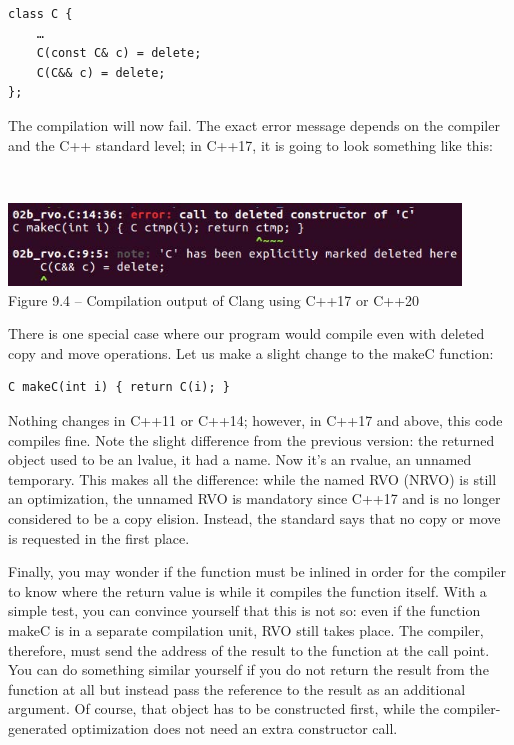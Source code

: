 \begin{lstlisting}[style=styleCXX]
class C {
	…
	C(const C& c) = delete;
	C(C&& c) = delete;
}; 
\end{lstlisting}

The compilation will now fail. The exact error message depends on the compiler and the C++ standard level; in C++17, it is going to look something like this:

\hspace*{\fill} \\ %
\begin{center}
\includegraphics[width=0.9\textwidth]{content/3/chapter9/images/4.jpg}\\
Figure 9.4 – Compilation output of Clang using C++17 or C++20
\end{center}

There is one special case where our program would compile even with deleted copy and move operations. Let us make a slight change to the makeC function:

\begin{lstlisting}[style=styleCXX]
C makeC(int i) { return C(i); }
\end{lstlisting}

Nothing changes in C++11 or C++14; however, in C++17 and above, this code compiles fine. Note the slight difference from the previous version: the returned object used to be an lvalue, it had a name. Now it’s an rvalue, an unnamed temporary. This makes all the difference: while the named RVO (NRVO) is still an optimization, the unnamed RVO is mandatory since C++17 and is no longer considered to be a copy elision. Instead, the standard says that no copy or move is requested in the first place. 

Finally, you may wonder if the function must be inlined in order for the compiler to know where the return value is while it compiles the function itself. With a simple test, you can convince yourself that this is not so: even if the function makeC is in a separate compilation unit, RVO still takes place. The compiler, therefore, must send the address of the result to the function at the call point. You can do something similar yourself if you do not return the result from the function at all but instead pass the reference to the result as an additional argument. Of course, that object has to be constructed first, while the compiler-generated optimization does not need an extra constructor call. 

